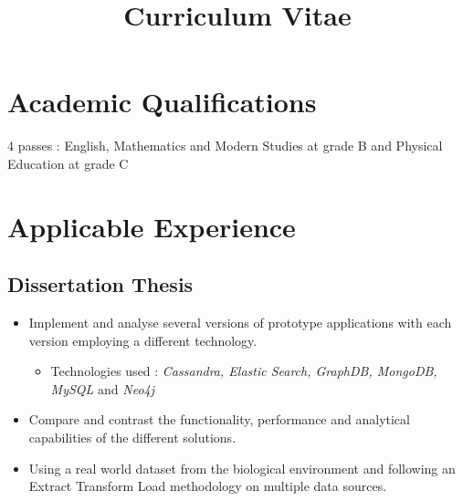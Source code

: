 \documentclass[11pt,a4paper,sans]{moderncv}
\title{Curriculum Vitae}            \address{20 Gardrum Gardens, Shieldhill}{Falkirk, FK1 2TB }{Scotland}
\begin{document}
\makecvtitle

\section{Academic Qualifications}
4 passes : English, Mathematics and Modern Studies at grade B and Physical Education at grade C
\section{Applicable Experience}
\subsection{Dissertation Thesis}
\begin{itemize}
\item Implement and analyse several versions of prototype applications with each version employing a different technology.
\begin{itemize}
\item Technologies used : \textit{Cassandra, Elastic Search, GraphDB, MongoDB, MySQL} and \textit{Neo4j}
\end{itemize}
\item  Compare and contrast the functionality, performance and analytical capabilities of the different solutions.
\item Using a real world dataset from the biological environment and following an Extract Transform Load methodology on multiple data sources.
\end{itemize}
\end{document}

